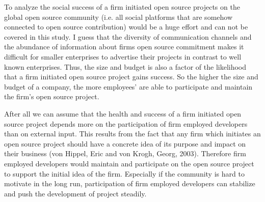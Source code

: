 To analyze the social success of a firm initiated open source projects on the global open source community (i.e. all social platforms that are somehow connected to open source contribution) would be a huge effort and can not be covered in this study. I guess that the diversity of communication channels and the abundance of information about firms open source commitment makes it difficult for smaller enterprises to advertise their projects in contrast to well known enterprises. Thus, the size and budget is also a factor of the likelihood that a firm initiated open source project gains success. So the higher the size and budget of a company, the more employees’ are able to participate and maintain the firm’s open source project.

After all we can assume that the health and success of a firm initiated open source project depends more on the participation of firm employed developers than on external input. This results from the fact that any firm which initiates an open source project should have a concrete idea of its purpose and impact on their business (von Hippel, Eric and von Krogh, Georg, 2003).  Therefore firm employed developers would maintain and participate on the open source project to support the initial idea of the firm. Especially if the community is hard to motivate in the long run, participation of firm employed developers can stabilize and push the development of project steadily.
